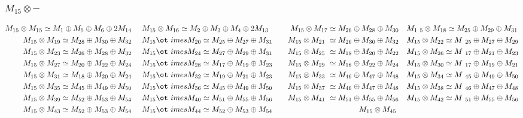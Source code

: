 \subsubsection{$M_15\otimes -$}
\begin{align*}
M_{15} \otimes M_{15} \simeq M_{1} \oplus M_{5} \oplus M_{6} \oplus 2 M_{14} &\
&& M_{15} \otimes M_{16} \simeq M_{2} \oplus M_{3} \oplus M_{4} \oplus 2 M_{13\
} &&& M_{15} \otimes M_{17} \simeq M_{26} \oplus M_{28} \oplus M_{30} &&& M_{1\
5} \otimes M_{18} \simeq M_{25} \oplus M_{29} \oplus M_{31}\\
M_{15} \otimes M_{19} \simeq M_{28} \oplus M_{30} \oplus M_{32} &&& M_{15} \ot\
imes M_{20} \simeq M_{25} \oplus M_{27} \oplus M_{31} &&& M_{15} \otimes M_{21\
} \simeq M_{26} \oplus M_{30} \oplus M_{32} &&& M_{15} \otimes M_{22} \simeq M\
_{25} \oplus M_{27} \oplus M_{29}\\
M_{15} \otimes M_{23} \simeq M_{26} \oplus M_{28} \oplus M_{32} &&& M_{15} \ot\
imes M_{24} \simeq M_{27} \oplus M_{29} \oplus M_{31} &&& M_{15} \otimes M_{25\
} \simeq M_{18} \oplus M_{20} \oplus M_{22} &&& M_{15} \otimes M_{26} \simeq M\
_{17} \oplus M_{21} \oplus M_{23}\\
M_{15} \otimes M_{27} \simeq M_{20} \oplus M_{22} \oplus M_{24} &&& M_{15} \ot\
imes M_{28} \simeq M_{17} \oplus M_{19} \oplus M_{23} &&& M_{15} \otimes M_{29\
} \simeq M_{18} \oplus M_{22} \oplus M_{24} &&& M_{15} \otimes M_{30} \simeq M\
_{17} \oplus M_{19} \oplus M_{21}\\
M_{15} \otimes M_{31} \simeq M_{18} \oplus M_{20} \oplus M_{24} &&& M_{15} \ot\
imes M_{32} \simeq M_{19} \oplus M_{21} \oplus M_{23} &&& M_{15} \otimes M_{33\
} \simeq M_{46} \oplus M_{47} \oplus M_{48} &&& M_{15} \otimes M_{34} \simeq M\
_{45} \oplus M_{49} \oplus M_{50}\\
M_{15} \otimes M_{35} \simeq M_{45} \oplus M_{49} \oplus M_{50} &&& M_{15} \ot\
imes M_{36} \simeq M_{45} \oplus M_{49} \oplus M_{50} &&& M_{15} \otimes M_{37\
} \simeq M_{46} \oplus M_{47} \oplus M_{48} &&& M_{15} \otimes M_{38} \simeq M\
_{46} \oplus M_{47} \oplus M_{48}\\
M_{15} \otimes M_{39} \simeq M_{52} \oplus M_{53} \oplus M_{54} &&& M_{15} \ot\
imes M_{40} \simeq M_{51} \oplus M_{55} \oplus M_{56} &&& M_{15} \otimes M_{41\
} \simeq M_{51} \oplus M_{55} \oplus M_{56} &&& M_{15} \otimes M_{42} \simeq M\
_{51} \oplus M_{55} \oplus M_{56}\\
M_{15} \otimes M_{43} \simeq M_{52} \oplus M_{53} \oplus M_{54} &&& M_{15} \ot\
imes M_{44} \simeq M_{52} \oplus M_{53} \oplus M_{54} &&& M_{15} \otimes M_{45\
}
\end{align*}
